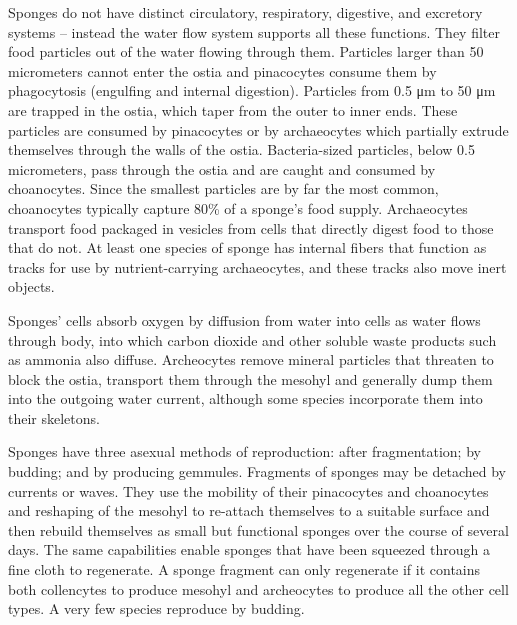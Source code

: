 Sponges do not have distinct circulatory, respiratory, digestive, and excretory systems -- instead the water flow system supports all these functions. They filter food particles out of the water flowing through them. Particles larger than 50 micrometers cannot enter the ostia and pinacocytes consume them by phagocytosis (engulfing and internal digestion). Particles from 0.5 μm to 50 μm are trapped in the ostia, which taper from the outer to inner ends. These particles are consumed by pinacocytes or by archaeocytes which partially extrude themselves through the walls of the ostia. Bacteria-sized particles, below 0.5 micrometers, pass through the ostia and are caught and consumed by choanocytes. Since the smallest particles are by far the most common, choanocytes typically capture 80\% of a sponge's food supply. Archaeocytes transport food packaged in vesicles from cells that directly digest food to those that do not. At least one species of sponge has internal fibers that function as tracks for use by nutrient-carrying archaeocytes, and these tracks also move inert objects.

Sponges' cells absorb oxygen by diffusion from water into cells as water flows through body, into which carbon dioxide and other soluble waste products such as ammonia also diffuse. Archeocytes remove mineral particles that threaten to block the ostia, transport them through the mesohyl and generally dump them into the outgoing water current, although some species incorporate them into their skeletons.

Sponges have three asexual methods of reproduction: after fragmentation; by budding; and by producing gemmules. Fragments of sponges may be detached by currents or waves. They use the mobility of their pinacocytes and choanocytes and reshaping of the mesohyl to re-attach themselves to a suitable surface and then rebuild themselves as small but functional sponges over the course of several days. The same capabilities enable sponges that have been squeezed through a fine cloth to regenerate. A sponge fragment can only regenerate if it contains both collencytes to produce mesohyl and archeocytes to produce all the other cell types. A very few species reproduce by budding.

